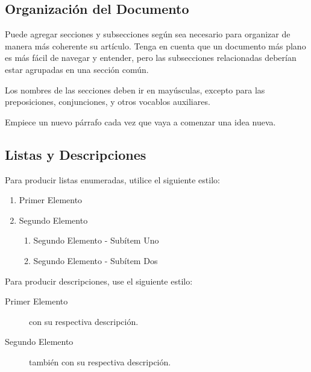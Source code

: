 \documentclass[a4paper]{article}
\begin{document}
	\subsection{Organización del Documento}\label{sub:results}
		Puede agregar secciones y subsecciones según sea necesario para organizar
		de manera más coherente su artículo. Tenga en cuenta que un documento más
		plano es más fácil de navegar y entender, pero las subsecciones relacionadas
		deberían estar agrupadas en una sección común.

		Los nombres de las secciones deben ir en mayúsculas, excepto para las
		preposiciones, conjunciones, y otros vocablos auxiliares.

		Empiece un nuevo párrafo cada vez que vaya a comenzar una idea nueva.

	\subsection{Listas y Descripciones}\label{sub:lists}
		Para producir listas enumeradas, utilice el siguiente estilo:
		\begin{enumerate}
			\item Primer Elemento
			\item Segundo Elemento
			\begin {enumerate}
				\item {Segundo Elemento - Subítem Uno}
				\item {Segundo Elemento - Subítem Dos}
			\end {enumerate}
		\end{enumerate}

		Para producir descripciones, use el siguiente estilo:

		\begin{description}
			\item [Primer Elemento] con su respectiva descripción.
			\item [Segundo Elemento] también con su respectiva descripción.
		\end{description}
\end{document}
